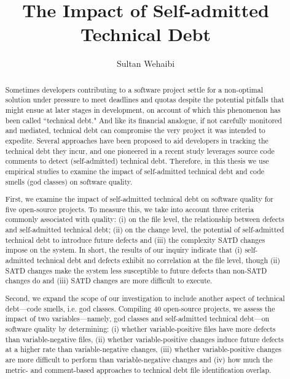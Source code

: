 \documentclass[12pt]{report}
\author{Sultan Wehaibi}
\title {The Impact of Self-admitted Technical Debt}
\newcommand{\SATD}{self-admitted technical debt\xspace}
\begin{document}
\begin{abstract}
	
	

Sometimes developers contributing to a software project settle for a non-optimal solution under pressure to meet deadlines and quotas despite the potential pitfalls that might ensue at later stages in development, on account of which this phenomenon has been called ``technical debt." And like its financial analogue, if not carefully monitored and mediated, technical debt can compromise the very project it was intended to expedite. Several approaches have been proposed to aid developers in tracking the technical debt they incur, and one pioneered in a recent study leverages source code comments to detect (self-admitted) technical debt. Therefore, in this thesis we use empirical studies to examine the impact of self-admitted technical debt and code smells (god classes) on software quality.

First, we examine the impact of \SATD on software quality for five open-source projects. To measure this, we take into account three criteria commonly associated with quality: (i) on the file level, the relationship between defects and \SATD; (ii) on the change level, the potential of \SATD to introduce future defects and (iii) the complexity SATD changes impose on the system. In short, the results of our inquiry indicate that (i) \SATD and defects exhibit no correlation at the file level, though (ii) SATD changes make the system less susceptible to future defects than non-SATD changes do and (iii) SATD changes are more difficult to execute.

Second, we expand the scope of our investigation to include another aspect of technical debt---code smells, i.e. god classes. Compiling 40 open-source projects, we assess the impact of two variables---namely, god classes and \SATD---on software quality by determining: (i) whether variable-positive files have more defects than variable-negative files, (ii) whether variable-positive changes induce future defects at a higher rate than variable-negative changes, (iii) whether variable-positive changes are more difficult to perform than variable-negative changes and (iv) how much the metric- and comment-based approaches to technical debt file identification overlap.


\end{abstract}
\end{document}
